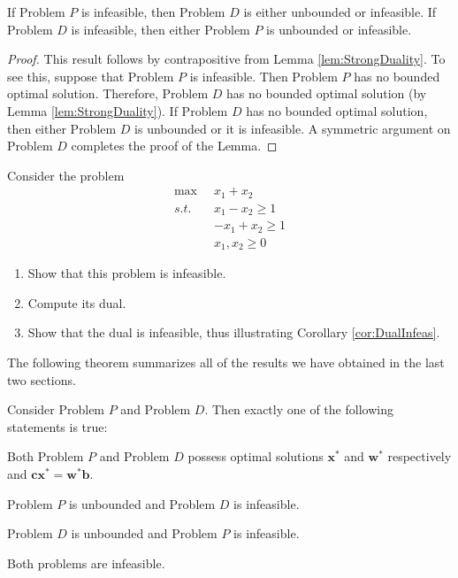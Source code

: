 \begin{corollary} If Problem $P$ is infeasible, then Problem $D$ is either unbounded or infeasible. If Problem $D$ is infeasible, then either Problem $P$ is unbounded or infeasible.
\label{cor:DualInfeas}
\end{corollary}
\begin{proof} This result follows by contrapositive from Lemma \ref{lem:StrongDuality}. To see this, suppose that Problem $P$ is infeasible. Then Problem $P$ has no bounded optimal solution. Therefore, Problem $D$ has no bounded optimal solution (by Lemma \ref{lem:StrongDuality}). If Problem $D$ has no bounded optimal solution, then either Problem $D$ is unbounded or it is infeasible. A symmetric argument on Problem $D$ completes the proof of the Lemma. 
\end{proof}

\begin{exercise} Consider the problem 
\begin{displaymath}
\begin{aligned}
\max\;\;&x_1 + x_2\\
s.t.\;\;&x_1 - x_2 \geq 1\\
& -x_1 + x_2 \geq 1\\
&x_1,x_2 \geq 0
\end{aligned}
\end{displaymath}
\begin{enumerate}
\item Show that this problem is infeasible. 
\item Compute its dual. 
\item Show that the dual is infeasible, thus illustrating Corollary \ref{cor:DualInfeas}.
\end{enumerate}
\end{exercise}

The following theorem summarizes all of the results we have obtained in the last two sections.
\begin{theorem} Consider Problem $P$ and Problem $D$. Then exactly one of the following statements is true:
\begin{enumerate*}
\item Both Problem $P$ and Problem $D$ possess optimal solutions $\mathbf{x}^*$ and $\mathbf{w}^*$ respectively and $\mathbf{c}\mathbf{x}^* = \mathbf{w}^*\mathbf{b}$.
\item Problem $P$ is unbounded and Problem $D$ is infeasible.
\item Problem $D$ is unbounded and Problem $P$ is infeasible.
\item Both problems are infeasible.
\end{enumerate*}
\label{thm:StrongDuality}
\end{theorem}

